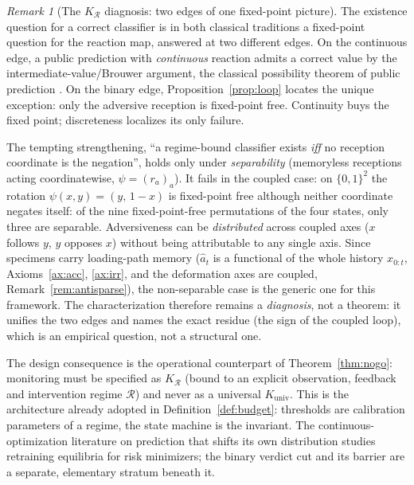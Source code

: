 \documentclass[11pt]{article}
\theoremstyle{plain}
\theoremstyle{definition}
\theoremstyle{remark}
\newtheorem{remark}[theorem]{Remark}
\begin{document}
\begin{remark}[The $K_{\mathcal R}$ diagnosis: two edges of one fixed-point picture]\label{rem:phir}
The existence question for a correct classifier is in both classical traditions a fixed-point question for the reaction map, answered at two different edges. On the continuous edge, a public prediction with \emph{continuous} reaction admits a correct value by the intermediate-value/Brouwer argument, the classical possibility theorem of public prediction \citep{grunbergmodigliani1954,simon1954}. On the binary edge, Proposition~\ref{prop:loop} locates the unique exception: only the adversive reception is fixed-point free. Continuity buys the fixed point; discreteness localizes its only failure.

The tempting strengthening, ``a regime-bound classifier exists \emph{iff} no reception coordinate is the negation'', holds only under \emph{separability} (memoryless receptions acting coordinatewise, $\psi=(r_a)_{a}$). It fails in the coupled case: on $\{0,1\}^2$ the rotation $\psi(x,y)=(y,\,1{-}x)$ is fixed-point free although neither coordinate negates itself: of the nine fixed-point-free permutations of the four states, only three are separable. Adversiveness can be \emph{distributed} across coupled axes ($x$ follows $y$, $y$ opposes $x$) without being attributable to any single axis. Since specimens carry loading-path memory ($\hat a_t$ is a functional of the whole history $x_{0:t}$, Axioms~\ref{ax:acc}, \ref{ax:irr}, and the deformation axes are coupled, Remark~\ref{rem:antisparse}), the non-separable case is the generic one for this framework. The characterization therefore remains a \emph{diagnosis}, not a theorem: it unifies the two edges and names the exact residue (the sign of the coupled loop), which is an empirical question, not a structural one.

The design consequence is the operational counterpart of Theorem~\ref{thm:nogo}: monitoring must be specified as $K_{\mathcal R}$ (bound to an explicit observation, feedback and intervention regime $\mathcal R$) and never as a universal $K_{\mathrm{univ}}$. This is the architecture already adopted in Definition~\ref{def:budget}: thresholds are calibration parameters of a regime, the state machine is the invariant. The continuous-optimization literature on prediction that shifts its own distribution \citep{perdomo2020} studies retraining equilibria for risk minimizers; the binary verdict cut and its barrier are a separate, elementary stratum beneath it.
\end{remark}
\end{document}
